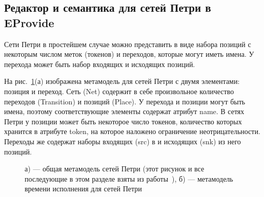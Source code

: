 \documentclass[a5paper]{article}
\begin{document}
\subsection{Редактор и семантика для сетей Петри в EProvide}

Сети Петри в простейшем случае можно представить в виде набора позиций с некоторым числом меток (токенов) и переходов, которые могут иметь имена. У перехода может быть набор входящих и исходящих позиций.

На рис.~\ref{fig9}(а) изображена метамодель для сетей Петри с двумя элементами: позиция и переход. Сеть (Net) содержит в себе произвольное количество переходов (Transition) и позиций (Place). У перехода и позиции могут быть имена, поэтому соответствующие элементы содержат атрибут name. В сетях Петри у позиции может быть некоторое число токенов, количество которых хранится в атрибуте token, на которое наложено ограничение неотрицательности. Переходы же содержат наборы входящих (src) в и исходящих (snk) из него позиций.

\begin{figure}[h]
\begin{center}
\begin{minipage}[h]{0.8\linewidth}
\end{minipage}
\begin{minipage}[h]{0.8\linewidth}
\end{minipage}
\end{center}
\caption{а) — общая метамодель сетей Петри (этот рисунок и все последующие в этом разделе взяты из работы~\cite{wachsmuth1}), б) — метамодель времени исполнения для сетей Петри}
\label{fig9}
\end{figure}
\end{document}
